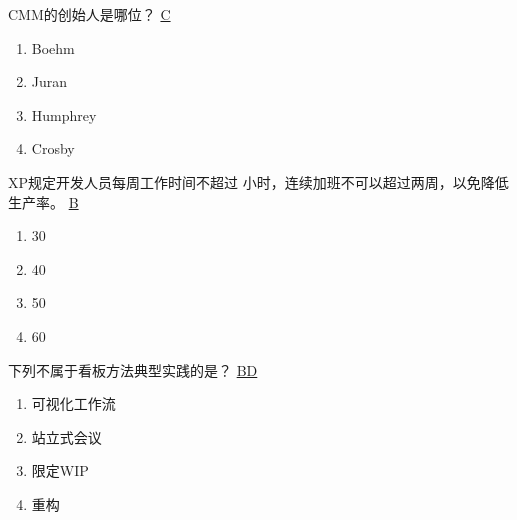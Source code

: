 \begin{problem}
	CMM的创始人是哪位？
	\uline{C}    
    \vspace{-0.8em}
    \begin{multicols}{4}
        \begin{enumerate}[label=\Alph*.]
            \item Boehm
            \item Juran
            \item Humphrey
            \item Crosby
        \end{enumerate}
    \end{multicols}
    \vspace{-1em}
\end{problem}



\begin{problem}
	XP规定开发人员每周工作时间不超过 \myline 小时，连续加班不可以超过两周，以免降低生产率。
	\uline{B}    
    \vspace{-0.8em}
    \begin{multicols}{4}
        \begin{enumerate}[label=\Alph*.]
            \item 30
            \item 40
            \item 50
            \item 60
        \end{enumerate}
    \end{multicols}
    \vspace{-1em}
\end{problem}



\begin{problem}
	下列不属于看板方法典型实践的是？
	\uline{BD}    
    \vspace{-0.8em}
    \begin{multicols}{4}
        \begin{enumerate}[label=\Alph*.]
            \item 可视化工作流
            \item 站立式会议
            \item 限定WIP
            \item 重构
        \end{enumerate}
    \end{multicols}
    \vspace{-1em}
\end{problem}

